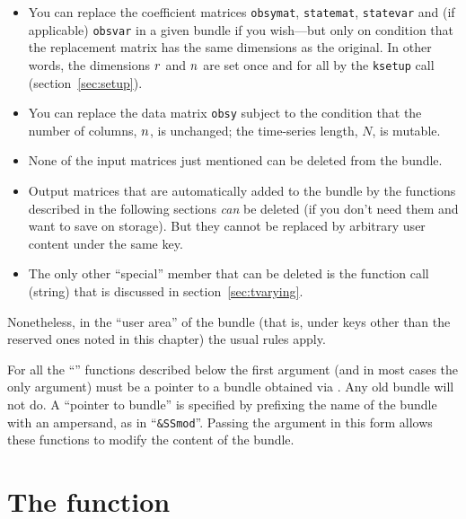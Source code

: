 \begin{itemize}
\item You can replace the coefficient matrices \texttt{obsymat},
  \texttt{statemat}, \texttt{statevar} and (if applicable)
  \texttt{obsvar} in a given bundle if you wish---but only on
  condition that the replacement matrix has the same dimensions as the
  original. In other words, the dimensions $r$ and $n$ are
  set once and for all by the \texttt{ksetup} call
  (section~\ref{sec:setup}).
\item You can replace the data matrix \texttt{obsy} subject to the
  condition that the number of columns, $n$, is unchanged; the
  time-series length, $N$, is mutable.
\item None of the input matrices just mentioned can be deleted from
  the bundle.
\item Output matrices that are automatically added to the bundle by
  the functions described in the following sections \textit{can} be
  deleted (if you don't need them and want to save on storage). But
  they cannot be replaced by arbitrary user content under the same
  key.
\item The only other ``special'' member that can be deleted is the
  function call (string) that is discussed in
  section~\ref{sec:tvarying}.
\end{itemize}

Nonetheless, in the ``user area'' of the bundle (that is, under keys
other than the reserved ones noted in this chapter) the usual rules
apply.

For all the ``'' functions described below the first argument
(and in most cases the only argument) must be a pointer to a bundle
obtained via . Any old bundle will not do. A ``pointer to
bundle'' is specified by prefixing the name of the bundle with an
ampersand, as in ``\verb|&SSmod|''. Passing the argument in this
form allows these functions to modify the content of the bundle.

\section{The  function}
\label{sec:kfilter}

